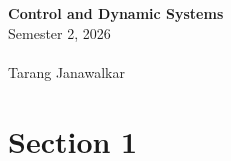\documentclass{article}
\date{}
\newcommand{\unitName}{Control and Dynamic Systems}
\newcommand{\unitTime}{Semester 2, 2026}
\newcommand{\unitCoordinator}{}
\newcommand{\documentAuthors}{Tarang Janawalkar}
\begin{document}
%
\begin{titlepage}
    \vspace*{\fill}
    \begin{center}
        \LARGE{\textbf{\unitName}} \\[0.1in]
        \normalsize{\unitTime} \\[0.2in]
        \normalsize\textit{\unitCoordinator} \\[0.2in]
        \documentAuthors
    \end{center}
    \vspace*{\fill}
    \doclicenseThis
    \thispagestyle{empty}
\end{titlepage}
\newpage
%
\tableofcontents
\newpage
%
\section{Section 1}
\end{document}
